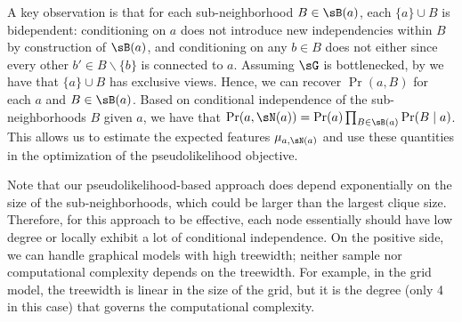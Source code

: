 A key observation is that for each sub-neighborhood $B \in \sB(a)$, each $\{a\} \cup B$ is bidependent:
conditioning on $a$ does not introduce new independencies within $B$ by construction of $\sB(a)$,
and conditioning on any $b \in B$ does not either since every other $b' \in B \backslash \{b\}$
is connected to $a$.
Assuming $\sG$ is bottlenecked, by 
we have that $\{a\} \cup B$ has exclusive views.
Hence, we can recover $\Pr(a,B)$ for each $a$ and $B \in \sB(a)$.
Based on conditional independence of the sub-neighborhoods $B$ given $a$,
we have that $\Pr(a, \sN(a)) = \Pr(a) \prod_{B \in \sB(a)} \Pr(B \mid a)$.
This allows us to estimate the expected features $\mu_{a,\sN(a)}$ and use these quantities
in the optimization of the pseudolikelihood objective.


Note that our pseudolikelihood-based approach
does depend exponentially on the size of the sub-neighborhoods,
which could be larger than the largest clique size.
Therefore,
for this approach to be effective,
each node essentially should have low degree or locally exhibit a lot of
conditional independence.
On the positive side, we can handle graphical models with high treewidth;
neither sample nor computational complexity depends on the treewidth.
For example, in the grid model, the treewidth is linear in the size of the grid,
but it is the degree (only 4 in this case) that governs the computational complexity.
